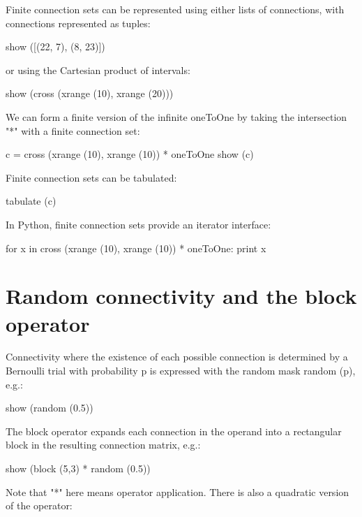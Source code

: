 \documentclass[a4paper,twoside]{report}
\begin{document}
Finite connection sets can be represented using either lists of
connections, with connections represented as tuples:

\begin{code}{}
  show ([(22, 7), (8, 23)])
\end{code}

or using the Cartesian product of intervals:

\begin{code}{}
  show (cross (xrange (10), xrange (20)))
\end{code}

We can form a finite version of the infinite oneToOne by taking the
intersection "*" with a finite connection set:

\begin{code}{}
  c = cross (xrange (10), xrange (10)) * oneToOne
  show (c)
\end{code}

Finite connection sets can be tabulated:

\begin{code}{}
  tabulate (c)
\end{code}

In Python, finite connection sets provide an iterator interface:

\begin{code}{}
  for x in cross (xrange (10), xrange (10)) * oneToOne:
    print x
\end{code}

\section{Random connectivity and the block operator}

Connectivity where the existence of each possible connection is
determined by a Bernoulli trial with probability p is expressed with
the random mask random (p), e.g.:

\begin{code}{}
  show (random (0.5))
\end{code}

The block operator expands each connection in the operand into a
rectangular block in the resulting connection matrix, e.g.:

\begin{code}{}
  show (block (5,3) * random (0.5))
\end{code}

Note that "*" here means operator application.  There is also a
quadratic version of the operator:
\end{document}
